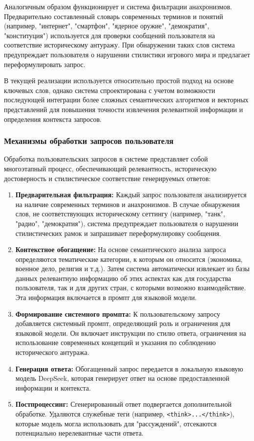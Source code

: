 Аналогичным образом функционирует и система фильтрации анахронизмов. Предварительно составленный словарь современных терминов и понятий (например, "интернет", "смартфон", "ядерное оружие", "демократия", "конституция") используется для проверки сообщений пользователя на соответствие историческому антуражу. При обнаружении таких слов система предупреждает пользователя о нарушении стилистики игрового мира и предлагает переформулировать запрос.

В текущей реализации используется относительно простой подход на основе ключевых слов, однако система спроектирована с учетом возможности последующей интеграции более сложных семантических алгоритмов и векторных представлений для повышения точности извлечения релевантной информации и определения контекста запросов.

\subsubsection{Механизмы обработки запросов пользователя}

Обработка пользовательских запросов в системе представляет собой многоэтапный процесс, обеспечивающий релевантность, историческую достоверность и стилистическое соответствие генерируемых ответов:

\begin{enumerate}
\item \textbf{Предварительная фильтрация:} Каждый запрос пользователя анализируется на наличие современных терминов и анахронизмов. В случае обнаружения слов, не соответствующих историческому сеттингу (например, "танк", "радио", "демократия"), система предупреждает пользователя о нарушении стилистических рамок и запрашивает переформулировку сообщения.

\item \textbf{Контекстное обогащение:} На основе семантического анализа запроса определяются тематические категории, к которым он относится (экономика, военное дело, религия и т.д.). Затем система автоматически извлекает из базы данных релевантную информацию об этих аспектах как для государства пользователя, так и для других стран, с которыми возможно взаимодействие. Эта информация включается в промпт для языковой модели.

\item \textbf{Формирование системного промпта:} К пользовательскому запросу добавляется системный промпт, определяющий роль и ограничения для языковой модели. Он включает инструкции по стилю ответа, ограничения на использование современных концепций и указания по соблюдению исторического антуража.

\item \textbf{Генерация ответа:} Обогащенный запрос передается в локальную языковую модель DeepSeek, которая генерирует ответ на основе предоставленной информации и контекста.

\item \textbf{Постпроцессинг:} Сгенерированный ответ подвергается дополнительной обработке. Удаляются служебные теги (например, \texttt{<think>...</think>}), которые модель могла использовать для "{}рассуждений"{}, отсекаются потенциально нерелевантные части ответа.
\end{enumerate}

